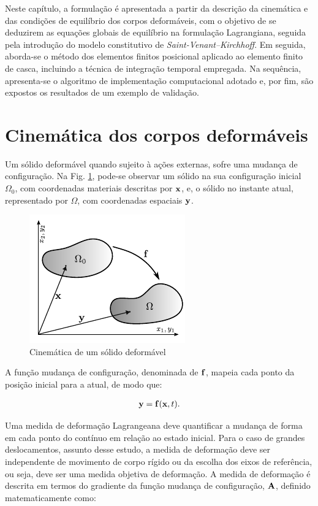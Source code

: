\documentclass[tese_patricia]{subfiles}
\begin{document}
Neste capítulo, a formulação é apresentada a partir da descrição da cinemática e das condições de equilíbrio dos corpos deformáveis, com o objetivo de se deduzirem as equações globais de equilíbrio na formulação Lagrangiana, seguida pela introdução do modelo constitutivo de \textit{Saint-Venant–Kirchhoff}. Em seguida, aborda-se o método dos elementos finitos posicional aplicado ao elemento finito de casca, incluindo a técnica de integração temporal empregada. Na sequência, apresenta-se o algoritmo de implementação computacional adotado e, por fim, são expostos os resultados de um exemplo de validação.


\section{Cinemática dos corpos deformáveis}

Um sólido deformável quando sujeito à ações externas, sofre uma mudança de configuração. Na Fig. \ref{fig:solido_cinematica}, pode-se observar um sólido na sua configuração inicial $\Omega_{0}$, com coordenadas materiais descritas por $\mathbf{x}$, e, o sólido no instante atual, representado por $\Omega$, com coordenadas espaciais $\mathbf{y}$. 

\begin{figure}[htb!]
	\centering
	\includegraphics[scale=1.7]{Imagens/Cap4/sol_cinematica.pdf}	
	\caption{Cinemática de um sólido deformável}
	\label{fig:solido_cinematica}
\end{figure}

A função mudança de configuração, denominada de $\mathbf{f}$, mapeia cada ponto da posição inicial para a atual, de modo que:

\begin{align}
	\mathbf{y} = \mathbf{f}(\mathbf{x},t).
\end{align}

Uma medida de deformação Lagrangeana deve quantificar a mudança de forma em cada ponto do contínuo em relação ao estado inicial. Para o caso de grandes deslocamentos, assunto desse estudo, a medida de deformação deve ser independente de movimento de corpo rígido ou da escolha dos eixos de referência, ou seja, deve ser uma medida objetiva de deformação. A medida de deformação é descrita em termos do gradiente da função mudança de configuração, $\mathbf{A}$, definido matematicamente como:
\end{document}

